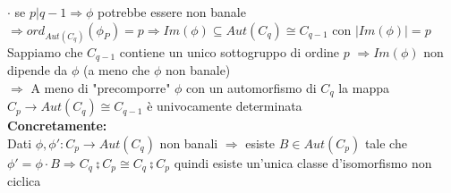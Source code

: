\documentclass[12px]{article}
\begin{document}
 $\cdot$ se $p | q-1 \Rightarrow \phi$ potrebbe essere non banale $ \Rightarrow ord_{Aut(C_q)}(\phi_P) = p \Rightarrow Im(\phi)\subseteq Aut(C_q)\cong C_{q-1}$ con $|Im(\phi)| = p$\\
 Sappiamo che  $C_{q-1}$ contiene un unico sottogruppo di ordine $p$ $ \Rightarrow Im(\phi)$ non dipende da $\phi$ (a meno che $\phi$ non banale)\\
 $ \Rightarrow $ A meno di "precomporre" $\phi$ con un automorfismo di $C_q$ la mappa $C_p \rightarrow Aut(C_q)\cong C_{q-1}$ è univocamente determinata\\
 \textbf{Concretamente:}\\
 Dati $\phi,\phi': C_p \rightarrow Aut(C_q)$ non banali $ \Rightarrow $ esiste $B\in Aut(C_p)$ tale che $\phi' = \phi\cdot B \Rightarrow C_q\semi C_p\cong C_q\semi C_p$ quindi esiste un'unica classe d'isomorfismo non ciclica\\
 \newpage
\end{document}
